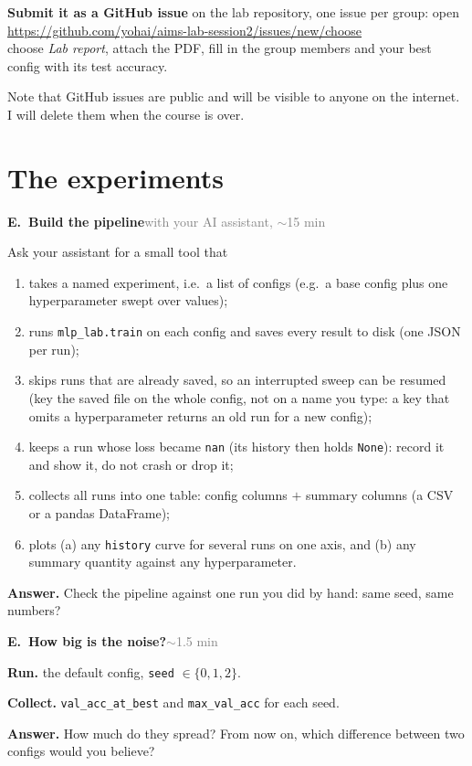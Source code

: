 \documentclass[11pt]{article}
\newcommand{\code}[1]{\texttt{#1}}
\newcounter{exp}
\newenvironment{experiment}[2]{\refstepcounter{exp}\par\medskip
  \textbf{\textcolor{aiblue}{E\theexp.\ #1}}\hfill{\small\textcolor{gray}{#2}}\par}{\par}
\newcommand{\run}[1]{\textbf{Run.} #1\par}
\newcommand{\collect}[1]{\textbf{Collect.} #1\par}
\newcommand{\answer}[1]{\textbf{Answer.} #1\par}
\begin{document}
\textbf{Submit it as a GitHub issue} on the lab repository, one issue per group: open\\
\url{https://github.com/yohai/aims-lab-session2/issues/new/choose}\\
choose \emph{Lab report}, attach the PDF, fill in the group members and your best config with its test accuracy. 

Note that GitHub issues are public and will be visible to anyone on the internet. I will delete them when the course is over.

\section*{The experiments}
\setcounter{exp}{-1}
\begin{experiment}{Build the pipeline}{with your AI assistant, $\sim$15 min}
Ask your assistant for a small tool that
\begin{enumerate}
  \item takes a named experiment, i.e.\ a list of configs (e.g.\ a base config plus one hyperparameter swept over values);
  \item runs \code{mlp\_lab.train} on each config and saves every result to disk (one JSON per run);
  \item skips runs that are already saved, so an interrupted sweep can be resumed (key the saved file on the whole config, not on a name you type: a key that omits a hyperparameter returns an old run for a new config);
  \item keeps a run whose loss became \code{nan} (its history then holds \code{None}): record it and show it, do not crash or drop it;
  \item collects all runs into one table: config columns $+$ summary columns (a CSV or a pandas DataFrame);
  \item plots (a) any \code{history} curve for several runs on one axis, and (b) any summary quantity against any hyperparameter.
\end{enumerate}
\answer{Check the pipeline against one run you did by hand: same seed, same numbers?}
\end{experiment}

\begin{experiment}{How big is the noise?}{$\sim$1.5 min}
\run{the default config, \code{seed} $\in\{0,1,2\}$.}
\collect{\code{val\_acc\_at\_best} and \code{max\_val\_acc} for each seed.}
\answer{How much do they spread? From now on, which difference between two configs would you believe?}
\end{experiment}
\end{document}
